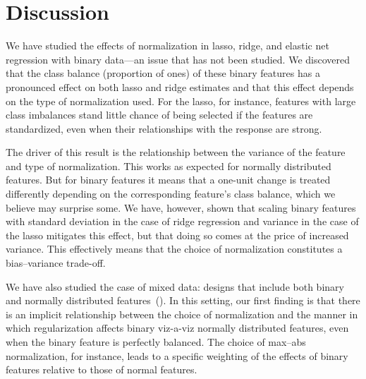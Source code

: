 \section{Discussion}


We have studied the effects of normalization in lasso, ridge, and elastic net regression
with binary data---an issue that has not been studied. We discovered that the class balance
(proportion of ones) of these binary features has a pronounced effect on both lasso and
ridge estimates and that this effect depends on the type of normalization used. For the
lasso, for instance, features with large class imbalances stand little chance of being
selected if the features are standardized, even when their relationships with the response
are strong.

The driver of this result is the relationship between the variance of the feature and type
of normalization. This works as expected for normally distributed features. But for binary
features it means that a one-unit change is treated differently depending on the
corresponding feature's class balance, which we believe may surprise some. We have,
however, shown that scaling binary features with standard deviation in the case of ridge
regression and variance in the case of the lasso mitigates this effect, but that doing so
comes at the price of increased variance. This effectively means that the choice of
normalization constitutes a bias--variance trade-off.


We have also studied the case of mixed data: designs that include both binary and normally
distributed features~(). In this setting, our first finding is that
there is an implicit relationship between the choice of normalization and the manner in
which regularization affects binary viz-a-viz normally distributed features, even when the
binary feature is perfectly balanced. The choice of max--abs normalization, for instance,
leads to a specific weighting of the effects of binary features relative to those of normal
features.

